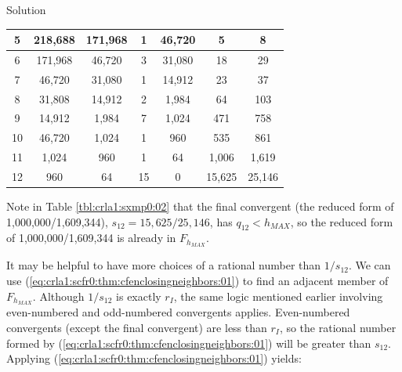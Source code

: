 \begin{vworkexampleparsection}{Solution}
\begin{table}
\begin{center}
\begin{tabular}{|c|c|c|c|c|c|c|}
\hline
\small{5}     & \small{218,688}           & \small{171,968}            & \small{1}       & \small{46,720}          & \small{5}          & \small{8}           \\
\hline
\small{6}     & \small{171,968}           & \small{46,720}             & \small{3}       & \small{31,080}          & \small{18}         & \small{29}          \\
\hline
\small{7}     & \small{46,720}            & \small{31,080}             & \small{1}       & \small{14,912}          & \small{23}         & \small{37}          \\
\hline
\small{8}     & \small{31,808}            & \small{14,912}             & \small{2}       & \small{1,984}           & \small{64}         & \small{103}         \\
\hline
\small{9}     & \small{14,912}            & \small{1,984}              & \small{7}       & \small{1,024}           & \small{471}        & \small{758}         \\
\hline
\small{10}    & \small{46,720}            & \small{1,024}              & \small{1}       & \small{960}             & \small{535}        & \small{861}         \\
\hline
\small{11}    & \small{1,024}             & \small{960}                & \small{1}       & \small{64}              & \small{1,006}      & \small{1,619}       \\
\hline
\small{12}    & \small{960}               & \small{64}                 & \small{15}      & \small{0}               & \small{15,625}     & \small{25,146}      \\
\hline
\end{tabular}
\end{center}
\end{table}

Note in Table \ref{tbl:crla1:sxmp0:02} that the final convergent (the reduced
form of 1,000,000/1,609,344), $s_{12} = 15,\!625/25,\!146$, has
$q_{12} < h_{MAX}$, so the reduced form of 1,000,000/1,609,344
is already in $F_{h_{MAX}}$.

It may be helpful to have more choices of a rational number than $1/s_{12}$.  We can use
(\ref{eq:crla1:scfr0:thm:cfenclosingneighbors:01}) to find an adjacent member
of $F_{h_{MAX}}$.  Although $1/s_{12}$ is exactly $r_I$, the same logic mentioned
earlier involving even-numbered and odd-numbered convergents applies.  Even-numbered
convergents (except the final convergent) are less than $r_I$, so the rational number formed by
(\ref{eq:crla1:scfr0:thm:cfenclosingneighbors:01}) will be greater than $s_{12}$.
Applying (\ref{eq:crla1:scfr0:thm:cfenclosingneighbors:01}) yields:


\end{vworkexampleparsection}
